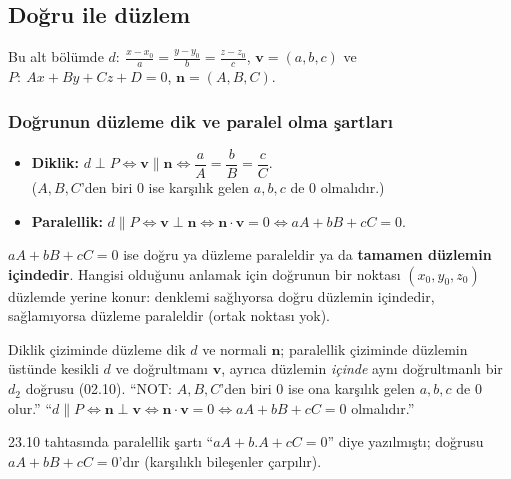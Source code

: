 \subsection{Doğru ile düzlem}

Bu alt bölümde $d:\ \frac{x-x_0}{a}=\frac{y-y_0}{b}=\frac{z-z_0}{c}$, $\mathbf v=(a,b,c)$ ve $P:\ Ax+By+Cz+D=0$, $\mathbf n=(A,B,C)$.

\subsubsection{Doğrunun düzleme dik ve paralel olma şartları}

\begin{teorem}
\begin{itemize}
  \item \textbf{Diklik:} $d\perp P\iff\mathbf v\parallel\mathbf n\iff\dfrac{a}{A}=\dfrac{b}{B}=\dfrac{c}{C}$.\\
  ($A,B,C$'den biri $0$ ise karşılık gelen $a,b,c$ de $0$ olmalıdır.)
  \item \textbf{Paralellik:} $d\parallel P\iff\mathbf v\perp\mathbf n\iff\mathbf n\cdot\mathbf v=0\iff aA+bB+cC=0$.
\end{itemize}
$aA+bB+cC=0$ ise doğru ya düzleme paraleldir ya da \textbf{tamamen düzlemin içindedir}. Hangisi olduğunu anlamak için doğrunun bir noktası $(x_0,y_0,z_0)$ düzlemde yerine konur: denklemi sağlıyorsa doğru düzlemin içindedir, sağlamıyorsa düzleme paraleldir (ortak noktası yok).
\end{teorem}

\begin{tahta}
Diklik çiziminde düzleme dik $d$ ve normali $\mathbf n$; paralellik çiziminde düzlemin üstünde kesikli $d$ ve doğrultmanı $\mathbf v$, ayrıca düzlemin \emph{içinde} aynı doğrultmanlı bir $d_2$ doğrusu (02.10). ``NOT: $A,B,C$'den biri 0 ise ona karşılık gelen $a,b,c$ de 0 olur.'' ``$d\parallel P\iff\mathbf n\perp\mathbf v\iff\mathbf n\cdot\mathbf v=0\iff aA+bB+cC=0$ olmalıdır.''
\end{tahta}
\begin{bilgi}
23.10 tahtasında paralellik şartı ``$aA+b.A+cC=0$'' diye yazılmıştı; doğrusu $aA+bB+cC=0$'dır (karşılıklı bileşenler çarpılır).
\end{bilgi}

